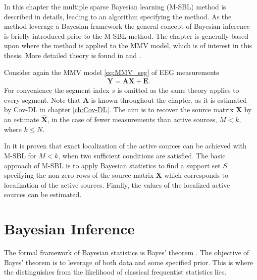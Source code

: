 In this chapter the multiple sparse Bayesian learning (M-SBL) method is described in details, leading to an algorithm specifying the method. As the method leverage a Bayesian framework the general concept of Bayesian inference is briefly introduced prior to the M-SBL method. The chapter is generally based upon \cite{Balkan2014} where the method is applied to the MMV model, which is of interest in this thesis. More detailed theory is found in \cite{phd_wipf} and \cite{article_wipf}.

Consider again the MMV model \eqref{eq:MMV_seg} of EEG measurements
\begin{align}
\mathbf{Y} = \mathbf{AX} + \mathbf{E}.\label{eq:MSBL_MMV}
\end{align}
For convenience the segment index $s$ is omitted as the same theory applies to every segment.  
Note that $\mathbf{A}$ is known throughout the chapter, as it is estimated by Cov-DL in chapter \ref{ch:Cov-DL}.
The aim is to recover the source matrix $\mathbf{X}$ by an estimate $\hat{\mathbf{X}}$, in the case of fewer measurements than active sources, $M < k$, where $k\leq N$. 

In \cite{Balkan2014} it is proven that exact localization of the active sources can be achieved with M-SBL for $M<k$, when two sufficient conditions are satisfied. 
The basic approach of M-SBL is to apply Bayesian statistics to find a support set $S$ specifying the non-zero rows of the source matrix $\mathbf{X}$ which corresponds to localization of the active sources. Finally, the values of the localized active sources can be estimated.  

\section{Bayesian Inference} 
The formal framework of Bayesian statistics is Bayes' theorem \cite[p. 86]{Kay}. The objective of Bayes' theorem is to leverage of both data and some specified prior. This is where the distinguishes from the likelihood of classical frequentist statistics lies.     

